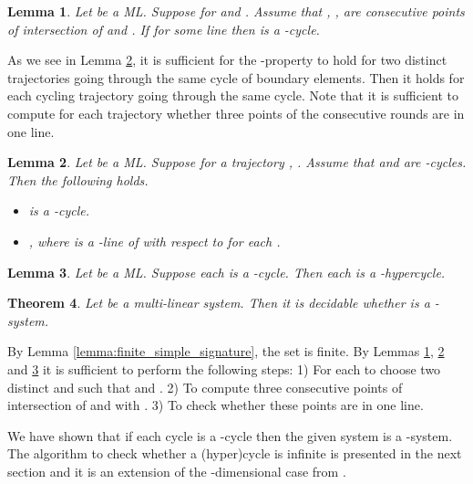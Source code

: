 \documentclass[copyright,creativecommons]{packages/eptcs}
\newcommand{\ml}{\mbox{ML}}
\newtheorem{theorem}{Theorem}[section]
\newtheorem{lemma}[theorem]{Lemma}
\newenvironment{proof}[1][Proof]{\begin{trivlist}
\item[\hskip \labelsep {\bfseries #1}]}{\end{trivlist}}
\begin{document}
\begin{lemma}\label{prop:traj} Let  be a  \ml. Suppose  for  and  . Assume that ,  ,  are consecutive points of intersection of  and . If  for some line  then   is a -cycle. 
\end{lemma}



As we see in Lemma \ref{lem:lambda-prop}, it is sufficient  for the -property to hold for two distinct trajectories going through the same  cycle of boundary elements.  Then it holds for each cycling trajectory
going through the same cycle. Note that it is sufficient to compute for each trajectory whether three points of the consecutive rounds are in one line.


\begin{lemma}\label{lem:lambda-prop} Let  be a \ml. Suppose  for a trajectory , .
Assume that   and  are -cycles. Then the following holds.
\begin{itemize}
 \item  is a -cycle. 
\item , where  is a  -line of  with respect to  for each . 
\end{itemize} 
\end{lemma}

\begin{lemma}\label{lemma:lambda_hypercycle} Let  be a \ml.  Suppose  each   is a -cycle. Then each   is a -hypercycle. 
\end{lemma}

\begin{theorem}\label{theorem:criterion} Let  be a multi-linear system. Then  it is decidable whether  is a -system.
\end{theorem}

\begin{proof}
 By Lemma  \ref{lemma:finite_simple_signature}, the set  is finite.  By  Lemmas \ref{prop:traj}, \ref{lem:lambda-prop} and \ref{lemma:lambda_hypercycle} it is sufficient to perform the following steps:
1) For each  to choose two distinct  and  such that  and  .  2) To compute  three consecutive points of intersection of  and  with . 3) To check whether these points are  in one line.    
\end{proof}

We have shown that if each  cycle is a -cycle then the given system is a -system. The algorithm to check whether a (hyper)cycle is infinite is presented in the next section and it  is an extension of the -dimensional case  from \cite{MP93}.
\end{document}
